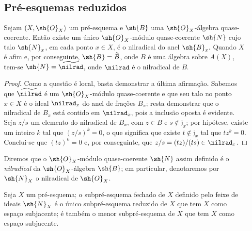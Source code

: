 \documentclass[oneside]{amsart}
\newcommand{\oldpage}[2][]{{\marginnote{\normalfont\textbf{#1}~|~#2}}\ignorespaces}
\let\EGAOriginalLabel\label
\renewcommand{\label}[1]{\phantomsection\EGAOriginalLabel{#1}}
\begin{document}
\subsection{Pré-esquemas reduzidos}
\label{subsection:I.5.1}

\begin{proposition}[5.1.1]
\label{I.5.1.1}
Sejam $(X,\sh{O}_X)$ um pré-esquema e $\sh{B}$ uma $\sh{O}_X$-álgebra quase-coerente.
Então existe um único $\sh{O}_X$-módulo quase-coerente $\sh{N}$ cujo talo $\sh{N}_x$, em cada ponto $x\in X$, é o nilradical do anel $\sh{B}_x$.
Quando $X$ é afim e, por conseguinte, $\sh{B}=\widetilde{B}$, onde $B$ é uma álgebra sobre $A(X)$, tem-se $\sh{N}=\widetilde{\nilrad}$, onde $\nilrad$ é o nilradical de $B$.
\end{proposition}

\begin{proof}
\oldpage[I]{128}
Como a questão é local, basta demonstrar a última afirmação.
Sabemos que $\widetilde{\nilrad}$ é um $\sh{O}_X$-módulo quase-coerente  e que seu talo no ponto $x\in X$ é o ideal $\nilrad_x$ do anel de frações $B_x$;
resta demonstrar que o nilradical de $B_x$ está contido em $\nilrad_x$, pois a inclusão oposta é evidente.
Seja $z/s$ um elemento do nilradical de $B_x$, com $z\in B$ e $s\not\in\mathfrak{j}_x$;
por hipótese, existe um inteiro $k$ tal que $(z/s)^k=0$, o que significa que existe $t\not\in\mathfrak{j}_x$ tal que $tz^k=0$.
Conclui-se que $(tz)^k=0$ e, por conseguinte, que $z/s=(tz)/(ts)\in\nilrad_x$.
\end{proof}

Diremos que o $\sh{O}_X$-módulo quase-coerente $\sh{N}$ assim definido é o \emph{nilradical} da $\sh{O}_X$-álgebra $\sh{B}$; em particular, denotaremos por $\sh{N}_X$ o nilradical de $\sh{O}_X$.

\begin{corollary}[5.1.2]
\label{I.5.1.2}
Seja $X$ um pré-esquema;
o subpré-esquema fechado de $X$ definido pelo feixe de ideais $\sh{N}_X$ é o único subpré-esquema reduzido  de $X$ que tem $X$ como espaço subjacente;
é também o menor subpré-esquema de $X$ que tem $X$ como espaço subjacente.
\end{corollary}
\end{document}
